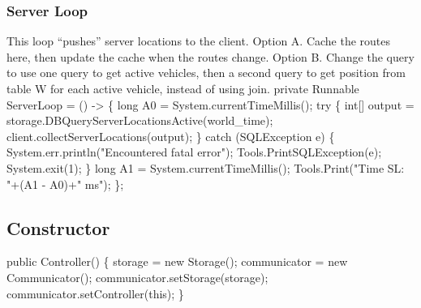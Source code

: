 \documentclass{article}
\def\nwendcode{\endtrivlist \endgroup}      %
\let\nwdocspar=\par
\begin{document}
\subsubsection{Server Loop}
This loop ``pushes'' server locations to the client.
Option A. Cache the routes here, then update the cache when the routes change.
Option B. Change the query to use one query to get active vehicles, then
  a second query to get position from table W for each active vehicle, instead
  of using join.
\nwenddocs{}\endmoddef{}
private Runnable ServerLoop = () -> \{
  long A0 = System.currentTimeMillis();
  try \{
    int[] output = storage.DBQueryServerLocationsActive(world_time);
    client.collectServerLocations(output);
  \} catch (SQLException e) \{
    System.err.println("Encountered fatal error");
    Tools.PrintSQLException(e);
    System.exit(1);
  \}
  long A1 = System.currentTimeMillis();
  Tools.Print("Time SL: "+(A1 - A0)+" ms");
\};
\eatline
{}\nwendcode{}\nwdocspar
\subsection{Constructor}
\nwenddocs{}\endmoddef{}
public Controller() \{
  storage = new Storage();
  communicator = new Communicator();
  communicator.setStorage(storage);
  communicator.setController(this);
\}
\nwendcode{}\nwdocspar
\end{document}
